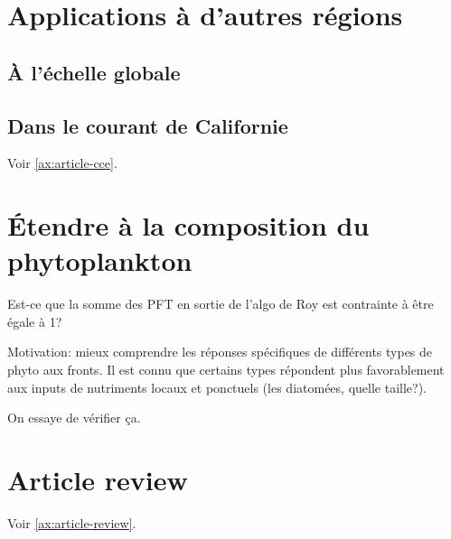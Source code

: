 
\label{chp:perspectives}

\minitoc%
\clearpage

\section{Applications à d'autres régions}
\label{sec:appl-autres-regions}

\subsection{À l'échelle globale}
\label{sec:global}

\subsection{Dans le courant de Californie}
\label{sec:CCE}

Voir \cref{ax:article-cce}.

\section{Étendre à la composition du phytoplankton}
\label{sec:persp-pft}

Est-ce que la somme des PFT en sortie de l'algo de Roy est contrainte à être égale à 1?

Motivation: mieux comprendre les réponses spécifiques de différents types de phyto aux fronts.
Il est connu que certains types répondent plus favorablement aux inputs de nutriments locaux et ponctuels (les diatomées, quelle taille?).

On essaye de vérifier ça.

\section{Article review}
Voir \cref{ax:article-review}.

\label{chp:conclusion}
